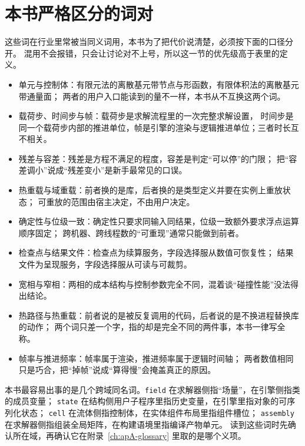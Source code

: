 \documentclass[12pt,a4paper,fontset=fandol]{ctexbook}
\newcommand{\Tp}[1]{\texttt{#1}}
\begin{document}
\section{本书严格区分的词对}

这些词在行业里常被当同义词用，本书为了把代价说清楚，必须按下面的口径分开。
混用不会报错，只会让讨论对不上号，所以这一节的优先级高于表里的定义。

\begin{itemize}
\item 单元与控制体：有限元法的离散基元带节点与形函数，有限体积法的离散基元带通量面；
  两者的用户入口能读到的量不一样，本书从不互换这两个词。
\item 载荷步、时间步与帧：载荷步是求解流程里的一次完整求解设置，
  时间步是同一个载荷步内部的推进单位，帧是引擎的渲染与逻辑推进单位；三者时长互不相关。
\item 残差与容差：残差是方程不满足的程度，容差是判定``可以停''的门限；
  把``容差调小''说成``残差变小''是新手最常见的口误。
\item 热重载与域重载：前者换的是库，后者换的是类型定义并要在实例上重放状态；
  可重放的范围由宿主决定，不由用户决定。
\item 确定性与位级一致：确定性只要求同输入同结果，位级一致额外要求浮点运算顺序固定；
  跨机器、跨线程数的``可重现''通常只能做到前者。
\item 检查点与结果文件：检查点为续算服务，字段选择服从数值可恢复性；
  结果文件为呈现服务，字段选择服从可读与可裁剪。
\item 宽相与窄相：两相的成本结构与控制参数完全不同，混着谈``碰撞性能''没法得出结论。
\item 热路径与热重载：前者说的是被反复调用的代码，后者说的是不换进程替换库的动作；
  两个词只差一个字，指的却是完全不同的两件事，本书一律写全称。
\item 帧率与推进频率：帧率属于渲染，推进频率属于逻辑时间轴；
  两者数值相同只是巧合，把``掉帧''说成``算得慢''会掩盖真正的原因。
\end{itemize}

\begin{warning}[title={一个名字的两种所指}]
本书最容易出事的是几个跨域同名词。\Tp{field} 在求解器侧指``场量''，在引擎侧指类的成员变量；
\Tp{state} 在结构侧用户子程序里指历史变量，在引擎里指对象的可序列化状态；
\Tp{cell} 在流体侧指控制体，在实体组件布局里指组件槽位；
\Tp{assembly} 在求解器侧指组装全局矩阵，在构建语境里指编译产物单元。
读到这些词时先确认所在域，再确认它在附录~\ref{ch:apA-glossary} 里取的是哪个义项。
\end{warning}
\end{document}
